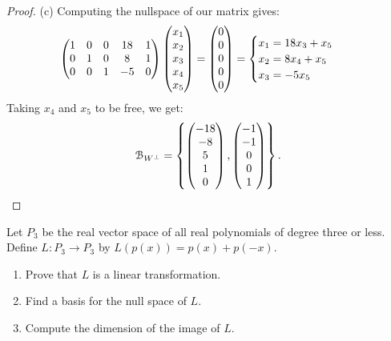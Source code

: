 \documentclass[10pt,twoside,openany]{memoir}
\begin{document}
{\begin{proof}
        (c) Computing the nullspace of our matrix gives:
            \begin{equation*}
            \begin{split}
                \left( \begin{matrix} 1 & 0 & 0 & 18 & 1 \\ 0 & 1 & 0 & 8 & 1 \\ 0 & 0 & 1 & -5 & 0 \end{matrix} \right) \left( \begin{matrix} x_1 \\ x_2 \\ x_3 \\ x_4 \\ x_5 \end{matrix} \right) = \left( \begin{matrix} 0 \\ 0 \\ 0 \\0 \\0  \end{matrix} \right)
                & = \begin{cases}
                    x_1 = 18x_3 + x_5 \\
                    x_2 = 8x_4 + x_5 \\
                    x_3 = -5x_5  
                \end{cases}
            \end{split}
            \end{equation*}
        Taking $x_4$ and $x_5$ to be free, we get:
            \begin{equation*}
            \begin{split}
                \mathcal{B}_{W^\perp} = \left\{ \left( \begin{matrix} -18 \\ -8 \\ 5 \\ 1 \\0 \end{matrix} \right), \left( \begin{matrix} -1 \\ -1 \\0 \\ 0 \\ 1 \end{matrix} \right) \right\}.
            \end{split}
            \end{equation*}
    \end{proof}}
\begin{problem}[F19, P1]
    Let $P_3$ be the real vector space of all real polynomials of degree three or less. Define $L:P_3 \rightarrow P_3$ by $L(p(x)) = p(x) + p(-x)$. 
    \begin{enumerate}[label = (\alph*),itemsep=1pt,topsep=3pt]
        \item Prove that $L$ is a linear transformation.
        \item Find a basis for the null space of $L$.
        \item Compute the dimension of the image of $L$.
    \end{enumerate}
\end{problem}
\end{document}
